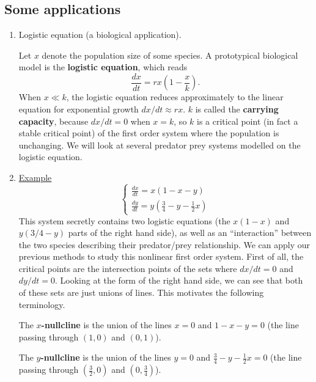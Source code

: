 \documentclass[11pt, letterpaper, oneside]{article}     %
\numberwithin{equation}{subsection}
\theoremstyle{definition}
\numberwithin{theorem}{section}
\theoremstyle{remark}
\begin{document}
\subsection{Some applications}

\begin{enumerate}

\item Logistic equation (a biological application).

  Let $x$ denote the population size of some species. A prototypical biological model is the \textbf{logistic equation}, which reads
  \begin{equation}\label{eq:logistic-equation}
    \frac{dx}{dt} = rx\left(1-\frac{x}{k}\right).
  \end{equation}
  When $x \ll k$, the logistic equation reduces approximately to the linear equation for exponential growth $dx/dt \approx rx$. $k$ is called the \textbf{carrying capacity}, because $dx/dt = 0$ when $x = k$, so $k$ is a critical point (in fact a stable critical point) of the first order system where the population is unchanging. We will look at several predator prey systems modelled on the logistic equation.

\item \underline{Example}
  \begin{equation}
    \begin{cases}
      \frac{dx}{dt} = x(1 - x - y)\\
      \frac{dy}{dt} = y\left(\frac{3}{4} - y - \frac{1}{2}x\right)
    \end{cases}
  \end{equation}
  This system secretly contains two logistic equations (the $x(1-x)$ and $y(3/4-y)$ parts of the right hand side), as well as an ``interaction'' between the two species describing their predator/prey relationship. We can apply our previous methods to study this nonlinear first order system. First of all, the critical points are the intersection points of the sets where $dx/dt = 0$ and $dy/dt = 0$. Looking at the form of the right hand side, we can see that both of these sets are just unions of lines. This motivates the following terminology.

  The \textbf{$x$-nullcline} is the union of the lines $x = 0$ and $1 - x - y = 0$ (the line passing through $(1, 0)$ and $(0, 1)$).

  The \textbf{$y$-nullcline} is the union of the lines $y = 0$ and $\frac{3}{4} - y - \frac{1}{2}x = 0$ (the line passing through $\left(\frac{3}{2}, 0\right)$ and $\left(0, \frac{3}{4}\right)$).


\end{enumerate}
\end{document}
